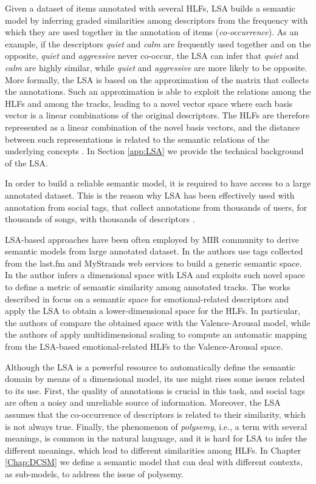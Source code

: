Given a dataset of items annotated with several HLFs, LSA builds a semantic model by inferring graded similarities among descriptors from the frequency with which they are used together in the annotation of items (\textit{co-occurrence}). As an example, if the descriptors \textit{quiet} and \textit{calm} are frequently used together and on the opposite, \textit{quiet} and \textit{aggressive} never co-occur, the LSA can infer that \textit{quiet} and \textit{calm} are highly similar, while \textit{quiet} and \textit{aggressive} are more likely to be opposite. More formally, the LSA is based on the approximation of the matrix that collects the annotations. Such an approximation is able to exploit the relations among the HLFs and among the tracks, leading to a novel vector space where each basis vector is a linear combinations of the original descriptors. The HLFs are therefore represented as a linear combination of the novel basis vectors, and the distance between such representations is related to the semantic relations of the underlying concepts \cite{Manning2008}. In Section \ref{app:LSA} we provide the technical background of the LSA.

In order to build a reliable semantic model, it is required to have access to a large annotated dataset. This is the reason why LSA has been effectively used with annotation from social tags, that collect annotations from thousands of users, for thousands of songs, with thousands of descriptors \cite{lamere2009}.

LSA-based approaches have been often employed by MIR community to derive semantic models from large annotated dataset. In \cite{Levy2007} the authors use tags collected from the last.fm and MyStrands web services to build a generic semantic space. In \cite{Celma2008} the author infers a dimensional space with LSA and exploits such novel space to define a metric of semantic similarity among annotated tracks. The works described in \cite{Laurier2009,saari2014semantic} focus on a semantic space for emotional-related descriptors and apply the LSA to obtain a lower-dimensional space for the HLFs. In particular, the authors of \cite{Laurier2009} compare the obtained space with the Valence-Arousal model, while the authors of \cite{saari2014semantic} apply multidimensional scaling to compute an automatic mapping from the LSA-based emotional-related HLFs to the Valence-Arousal space.

Although the LSA is a powerful resource to automatically define the semantic domain by means of a dimensional model, its use might rises some issues related to its use. First, the quality of annotations is crucial in this task, and social tags are often a noisy and unreliable source of information. Moreover, the LSA assumes that the co-occurrence of descriptors is related to their similarity, which is not always true. Finally, the phenomenon of \textit{polysemy}, i.e., a term with several meanings, is common in the natural language, and it is hard for LSA to infer the different meanings, which lead to different similarities among HLFs. In Chapter \ref{Chap:DCSM} we define a semantic model that can deal with different contexts, as sub-models, to address the issue of polysemy.

